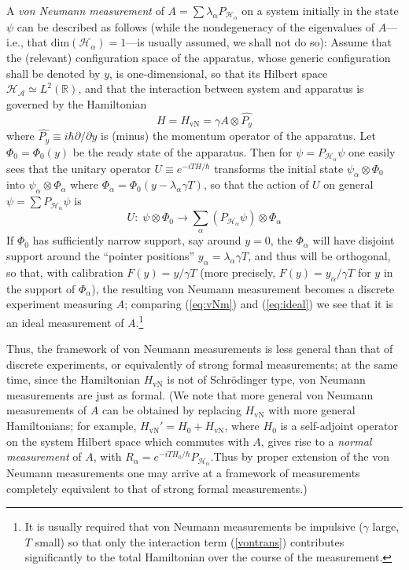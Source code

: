 \documentclass[12pt]{article}
\newcommand{\eq}[1]{(\ref{#1})}
\renewcommand{\a}{\alpha}
\newcommand{\la}{\lambda_{\a}}
\newcommand{\ot}{\otimes}
\newcommand{\Phia}{\Phi_{\a}}
\newcommand{\Ha}{{\H}_{\a}}
\renewcommand{\H}{\mbox{$\mathcal{H}$}}
\newcommand{\Pa}{ P_{ {\mathcal{H}_{\a} } } }
\newcommand{\Aa}{R_{\a}}
\newcommand{\R}{\mathbb{R}}
\begin{document}
A {\it von Neumann measurement\/} of $A=\sum \la \Pa $ on a system
initially in the state $\psi$ can be described as follows (while the
nondegeneracy of the eigenvalues of $A$---i.e., that
$\mbox{dim}(\Ha)=1$---is usually assumed, we shall not do so): Assume
that the (relevant) configuration space of the apparatus, whose
generic configuration shall be denoted by $y$, is one-dimensional, so
that its Hilbert space $\H_{\mathcal{A}}\simeq L^{2}(\R)$, and that
the interaction between system and apparatus is governed by the
Hamiltonian
\begin{equation}
H= H_{\text{vN}}= \gamma A\otimes \hat{P_{y}}
\label{vontrans}
\end{equation}
where $\hat{P_{y}}\equiv i\hbar\partial/\partial y$ is (minus) the
momentum operator of the apparatus.  Let $\Phi_0 = \Phi_0 (y) $ be the
ready state of the apparatus.  Then for $\psi=\Pa\psi$ one easily sees
that the unitary operator $U\equiv e^{-i TH/\hbar}$ transforms the
initial state $\psi_\a \ot \Phi_0$ into $ \psi _\a \ot \Phia$ where
$\Phia = \Phi_{0}(y - \la\gamma T)$, so that the action of $U$ on
general $\psi =\sum \Pa \psi$ is
\begin{equation}
U: \;\psi \ot \Phi_0  \to
\sum_{\a} (\Pa\psi) \ot \Phia
\label{eq:vNm}
\end{equation}
If $\Phi_{0}$ has sufficiently narrow support, say around $y=0$, the
$\Phia$ will have disjoint support around the ``pointer positions''
$y_\a = \la\gamma T$, and thus will be orthogonal, so that, with
calibration $F(y)= y /\gamma T$ (more precisely, $F(y)= y_\a /\gamma
T$ for $y$ in the support of $\Phi_\a$), the resulting von Neumann
measurement becomes a discrete experiment measuring $A$; comparing
(\ref{eq:vNm}) and (\ref{eq:ideal}) we see that it is an ideal
measurement of $A$.\footnote{It is usually required that von Neumann
   measurements be impulsive ($\gamma$ large, $T$ small) so that only
   the interaction term \eq{vontrans} contributes significantly to the
   total Hamiltonian over the course of the measurement.}

Thus, the framework of von Neumann measurements is less general than
that of discrete experiments, or equivalently of strong formal
measurements; at the same time, since the Hamiltonian $H_{\text{vN}}$
is not of Schr\"odinger type, von Neumann measurements are just as
formal.  (We note that more general von Neumann measurements of $A$
can be obtained by replacing $H_{\text{vN}}$ with more general
Hamiltonians; for example, $H_{\text{vN}}'= H_{0} + H_{\text{vN}}$,
where $H_0$ is a self-adjoint operator on the system Hilbert space
which commutes with $A$, gives rise to a \emph{normal measurement} of
$A$, with $\Aa = e^{-iT H_0/\hbar}\Pa$.Thus by proper extension of the
von Neumann measurements one may arrive at a framework of measurements
completely equivalent to that of strong formal measurements.)
\end{document}
